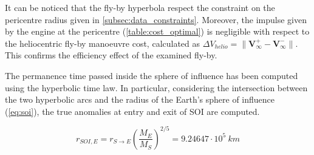 It can be noticed that the fly-by hyperbola respect the constraint on the pericentre radius given in \autoref{subsec:data_constraints}. Moreover, the impulse given by the engine at the pericentre (\autoref{table:cost_optimal}) is negligible with respect to the heliocentric fly-by manoeuvre cost, calculated as $\Delta V_{helio} = \lVert\boldsymbol{V_{\infty}^{+} - V_{\infty}^{-}} \rVert$. This confirms the efficiency effect of the examined fly-by. 

The permanence time passed inside the sphere of influence has been computed using the hyperbolic time law. In particular, considering the intersection between the two hyperbolic arcs and the radius of the Earth's sphere of influence (\autoref{eq:soi}), the true anomalies at entry and exit of SOI are computed.

\begin{equation}
    \label{eq:soi}
r_{SOI,E} = r_{S \to E}\left(\frac{M_E}{M_S}\right)^{2/5} = 9.24647 \cdot 10^{5} \ km
\end{equation}











